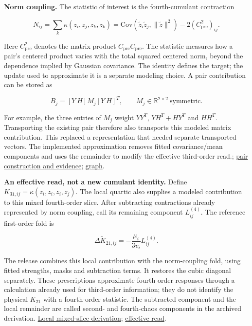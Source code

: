 \documentclass[11pt,letterpaper]{article}
\begin{document}
\textbf{Norm coupling.} The statistic of interest is the fourth-cumulant contraction

\begin{equation}
N_{ij}=\sum_k\kappa(z_i,z_j,z_k,z_k)
=\mathrm{Cov}(\widetilde z_i\widetilde z_j,\|\widetilde z\|^2)
-2(C_{\mathrm{pre}}^2)_{ij}.
\end{equation}

Here \(C_{\mathrm{pre}}^2\) denotes the matrix product \(C_{\mathrm{pre}}C_{\mathrm{pre}}\). The statistic measures how a pair's centered product varies with the total squared centered norm, beyond the dependence implied by Gaussian covariance. The identity defines the target; the update used to approximate it is a separate modeling choice. A pair contribution can be stored as

\begin{equation}
B_j=[Y\ H]M_j[Y\ H]^T,\qquad M_j\in\mathbb R^{2\times2}\ \text{symmetric}.
\end{equation}

For example, the three entries of \(M_j\) weight \(YY^T\), \(YH^T+HY^T\) and \(HH^T\). Transporting the existing pair therefore also transports this modeled matrix contribution. This replaced a representation that needed separate transported vectors. The implemented approximation removes fitted covariance/mean components and uses the remainder to modify the effective third-order read.; \href{https://github.com/mattliston/arc-whitebox-estimation-challenge/tree/main/experiments/fourth-order-terms/norm-coupling-law-column-pairs-lowers-mse-5-80/}{pair construction and evidence}; \href{https://mattliston.github.io/arc-whitebox-estimation-challenge/\#node=dev-pair-norm-coupling&view=map}{graph}.

\textbf{An effective read, not a new cumulant identity.} Define \(K_{31,ij}=\kappa(z_i,z_i,z_i,z_j)\). The local quartic also supplies a modeled contribution to this mixed fourth-order slice. After subtracting contractions already represented by norm coupling, call its remaining component \(L^{(4)}_{ij}\). The reference first-order fold is

\begin{equation}
\Delta\widetilde K_{21,ij}=-\frac{\mu_i}{3v_i}L^{(4)}_{ij}.
\end{equation}

The release combines this local contribution with the norm-coupling fold, using fitted strengths, masks and subtraction terms. It restores the cubic diagonal separately. These prescriptions approximate fourth-order responses through a calculation already used for third-order information; they do not identify the physical \(K_{21}\) with a fourth-order statistic. The subtracted component and the local remainder are called second- and fourth-chaos components in the archived derivation. \href{https://github.com/mattliston/arc-whitebox-estimation-challenge/blob/main/experiments/fourth-order-terms/norm-coupling-law-column-pairs-lowers-mse-5-80/NCAR6_SPEC.md\#L59}{Local mixed-slice derivation}; \href{https://github.com/mattliston/arc-whitebox-estimation-challenge/blob/main/submissions/337641/estimator.py\#L14502}{effective read}.
\end{document}
